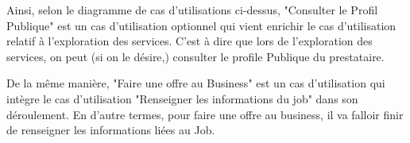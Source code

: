 {\begin{enumerate}
    \vspace{0.39cm}

    Ainsi, selon le diagramme de cas d'utilisations ci-dessus, "Consulter le Profil Publique" est un cas d'utilisation optionnel qui vient enrichir le cas d'utilisation relatif à l'exploration des services. C'est à dire que lors de l'exploration des services, on peut (si on le désire,) consulter le profile Publique du prestataire. 

    \vspace{0.39cm}
    
    De la même manière, "Faire une offre au Business" est un cas d'utilisation qui intègre le cas d'utilisation "Renseigner les informations du job" dans son déroulement. En d'autre termes, pour faire une offre au business, il va falloir finir de renseigner les informations liées au Job.

    \vspace{1.39cm}
        

\end{enumerate}}

